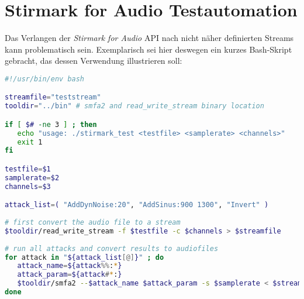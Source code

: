 \chapter{Stirmark for Audio Testautomation}
\label{ch:stirmarkaudio}

Das Verlangen der \textit{Stirmark for Audio} API nach nicht näher definierten Streams kann problematisch sein. Exemplarisch sei hier deswegen ein kurzes Bash-Skript gebracht, das dessen Verwendung illustrieren soll:
      
\begin{lstlisting}[language=bash,
				   caption=Anwendungsbeispiel für Stirmark for Audio,
				   captionpos=b]
#!/usr/bin/env bash

streamfile="teststream"
tooldir="../bin" # smfa2 and read_write_stream binary location

if [ $# -ne 3 ] ; then
   echo "usage: ./stirmark_test <testfile> <samplerate> <channels>"
   exit 1
fi

testfile=$1
samplerate=$2
channels=$3

attack_list=( "AddDynNoise:20", "AddSinus:900 1300", "Invert" )
			
# first convert the audio file to a stream
$tooldir/read_write_stream -f $testfile -c $channels > $streamfile
 
# run all attacks and convert results to audiofiles
for attack in "${attack_list[@]}" ; do
   attack_name=${attack%%:*}
   attack_param=${attack#*:}
   $tooldir/smfa2 --$attack_name $attack_param -s $samplerate < $streamfile | $tooldir/read_write_stream -p -s $samplerate -c $channels -f ${testfile%.wav}-attacked-$attack_name-${attack_param// /-}.wav
done
\end{lstlisting}









